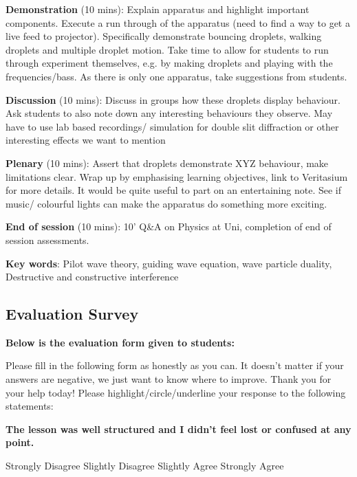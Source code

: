 \noindent \textbf{Demonstration} (10 mins): Explain apparatus and highlight important components. Execute a run through of the apparatus (need to find a way to get a live feed to projector). Specifically demonstrate bouncing droplets, walking droplets and multiple droplet motion. Take time to allow for students to run through experiment themselves, e.g. by making droplets and playing with the frequencies/bass. As there is only one apparatus, take suggestions from students. 

\noindent \textbf{Discussion} (10 mins): Discuss in groups how these droplets display behaviour. Ask students to also note down any interesting behaviours they observe. May have to use lab based recordings/ simulation for double slit diffraction or other interesting effects we want to mention

\noindent \textbf{Plenary} (10 mins): Assert that droplets demonstrate XYZ behaviour, make limitations clear. Wrap up by emphasising learning objectives, link to Veritasium for more details. It would be quite useful to part on an entertaining note. See if music/ colourful lights can make the apparatus do something more exciting. 

\noindent \textbf{End of session} (10 mins): 10' Q\&A on Physics at Uni, completion of end of session assessments. 



\noindent \textbf{Key words}: Pilot wave theory, guiding wave equation, wave particle duality, Destructive and constructive interference

\clearpage

\subsection{Evaluation Survey} \label{evaluationsurvey}
\noindent \textbf{Below is the evaluation form given to students:}
\vspace{3mm}

\noindent Please fill in the following form as honestly as you can. It doesn’t matter if your answers are negative, we just want to know where to improve. Thank you for your help today!
Please highlight/circle/underline your response to the following statements:

\vspace{3mm}

\noindent \textbf{The lesson was well structured and I didn’t feel lost or confused at any point.}

\vspace{3mm}
Strongly Disagree\hspace{1.5cm}	Slightly Disagree\hspace{1.5cm}	Slightly Agree\hspace{1.5cm}		Strongly Agree
\vspace{3mm}

